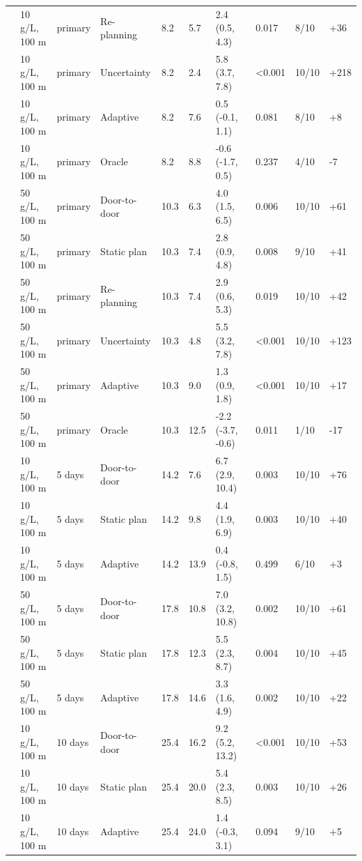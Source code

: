 \documentclass[sustainability,article,submit,pdftex,moreauthors]{Definitions/mdpi}
\begin{document}
{\begin{longtable}{L{3.0cm}L{2.0cm}L{1.0cm}L{1.6cm}R{1.0cm}R{1.4cm}L{2.4cm}R{0.9cm}R{0.8cm}R{0.9cm}}
 & 10 \textmu{}g/L, 100 m & primary & Re-planning & 8.2 & 5.7 & 2.4 (0.5, 4.3) & 0.017 & 8/10 & +36 \\
 & 10 \textmu{}g/L, 100 m & primary & Uncertainty & 8.2 & 2.4 & 5.8 (3.7, 7.8) & <0.001 & 10/10 & +218 \\
 & 10 \textmu{}g/L, 100 m & primary & Adaptive & 8.2 & 7.6 & 0.5 (-0.1, 1.1) & 0.081 & 8/10 & +8 \\
 & 10 \textmu{}g/L, 100 m & primary & Oracle & 8.2 & 8.8 & -0.6 (-1.7, 0.5) & 0.237 & 4/10 & -7 \\
 & 50 \textmu{}g/L, 100 m & primary & Door-to-door & 10.3 & 6.3 & 4.0 (1.5, 6.5) & 0.006 & 10/10 & +61 \\
 & 50 \textmu{}g/L, 100 m & primary & Static plan & 10.3 & 7.4 & 2.8 (0.9, 4.8) & 0.008 & 9/10 & +41 \\
 & 50 \textmu{}g/L, 100 m & primary & Re-planning & 10.3 & 7.4 & 2.9 (0.6, 5.3) & 0.019 & 10/10 & +42 \\
 & 50 \textmu{}g/L, 100 m & primary & Uncertainty & 10.3 & 4.8 & 5.5 (3.2, 7.8) & <0.001 & 10/10 & +123 \\
 & 50 \textmu{}g/L, 100 m & primary & Adaptive & 10.3 & 9.0 & 1.3 (0.9, 1.8) & <0.001 & 10/10 & +17 \\
 & 50 \textmu{}g/L, 100 m & primary & Oracle & 10.3 & 12.5 & -2.2 (-3.7, -0.6) & 0.011 & 1/10 & -17 \\
 & 10 \textmu{}g/L, 100 m & 5 days & Door-to-door & 14.2 & 7.6 & 6.7 (2.9, 10.4) & 0.003 & 10/10 & +76 \\
 & 10 \textmu{}g/L, 100 m & 5 days & Static plan & 14.2 & 9.8 & 4.4 (1.9, 6.9) & 0.003 & 10/10 & +40 \\
 & 10 \textmu{}g/L, 100 m & 5 days & Adaptive & 14.2 & 13.9 & 0.4 (-0.8, 1.5) & 0.499 & 6/10 & +3 \\
 & 50 \textmu{}g/L, 100 m & 5 days & Door-to-door & 17.8 & 10.8 & 7.0 (3.2, 10.8) & 0.002 & 10/10 & +61 \\
 & 50 \textmu{}g/L, 100 m & 5 days & Static plan & 17.8 & 12.3 & 5.5 (2.3, 8.7) & 0.004 & 10/10 & +45 \\
 & 50 \textmu{}g/L, 100 m & 5 days & Adaptive & 17.8 & 14.6 & 3.3 (1.6, 4.9) & 0.002 & 10/10 & +22 \\
 & 10 \textmu{}g/L, 100 m & 10 days & Door-to-door & 25.4 & 16.2 & 9.2 (5.2, 13.2) & <0.001 & 10/10 & +53 \\
 & 10 \textmu{}g/L, 100 m & 10 days & Static plan & 25.4 & 20.0 & 5.4 (2.3, 8.5) & 0.003 & 10/10 & +26 \\
 & 10 \textmu{}g/L, 100 m & 10 days & Adaptive & 25.4 & 24.0 & 1.4 (-0.3, 3.1) & 0.094 & 9/10 & +5 \\

\end{longtable}}
\end{document}
